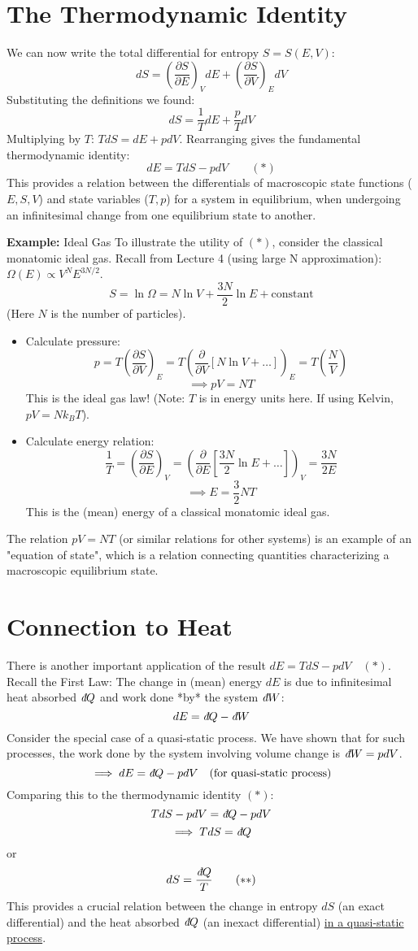 \documentclass[11pt]{article}
\newcommand{\pderiv}[2]{\frac{\partial #1}{\partial #2}}
\newcommand{\ethbar}{\text{\it{đ}}} %
\newcommand{\kb}{k_B} %
\begin{document}
\section*{The Thermodynamic Identity}

We can now write the total differential for entropy $S=S(E,V)$:
\[ dS = \left( \pderiv{S}{E} \right)_V dE + \left( \pderiv{S}{V} \right)_E dV \]
Substituting the definitions we found:
\[ dS = \frac{1}{T} dE + \frac{p}{T} dV \]
Multiplying by $T$: $T dS = dE + p dV$.
Rearranging gives the fundamental thermodynamic identity:
\[ dE = T dS - p dV \qquad (*) \]
This provides a relation between the differentials of macroscopic state functions ($E, S, V$) and state variables ($T, p$) for a system in equilibrium, when undergoing an infinitesimal change from one equilibrium state to another.

\textbf{Example:} Ideal Gas
To illustrate the utility of $(*)$, consider the classical monatomic ideal gas.
Recall from Lecture 4 (using large N approximation): $\Omega(E) \propto V^N E^{3N/2}$.
\[ S = \ln \Omega = N \ln V + \frac{3N}{2} \ln E + \text{constant} \]
(Here $N$ is the number of particles).
\begin{itemize}
    \item Calculate pressure:
    \[ p = T \left( \pderiv{S}{V} \right)_E = T \left( \pderiv{}{V} [N \ln V + \dots] \right)_E = T \left( \frac{N}{V} \right) \]
    \[ \implies pV = NT \]
    This is the ideal gas law! (Note: $T$ is in energy units here. If using Kelvin, $pV = N \kb T$).
    \item Calculate energy relation:
    \[ \frac{1}{T} = \left( \pderiv{S}{E} \right)_V = \left( \pderiv{}{E} [\frac{3N}{2} \ln E + \dots] \right)_V = \frac{3N}{2E} \]
    \[ \implies E = \frac{3}{2} NT \]
    This is the (mean) energy of a classical monatomic ideal gas.
\end{itemize}
The relation $pV=NT$ (or similar relations for other systems) is an example of an "equation of state", which is a relation connecting quantities characterizing a macroscopic equilibrium state.

\section*{Connection to Heat}

There is another important application of the result $dE = T dS - p dV \quad (*)$.
Recall the First Law: The change in (mean) energy $dE$ is due to infinitesimal heat absorbed $\ethbar Q$ and work done *by* the system $\ethbar W$:
\[ dE = \ethbar Q - \ethbar W \]
Consider the special case of a quasi-static process. We have shown that for such processes, the work done by the system involving volume change is $\ethbar W = p dV$.
\[ \implies dE = \ethbar Q - p dV \quad (\text{for quasi-static process}) \]
Comparing this to the thermodynamic identity $(*)$:
\[ T dS - p dV = \ethbar Q - p dV \]
\[ \implies T dS = \ethbar Q \]
or
\[ dS = \frac{\ethbar Q}{T} \qquad (**) \]
This provides a crucial relation between the change in entropy $dS$ (an exact differential) and the heat absorbed $\ethbar Q$ (an inexact differential) \underline{in a quasi-static process}.
\end{document}
